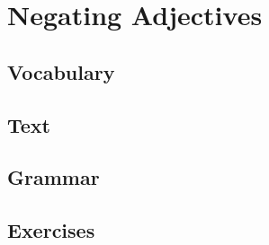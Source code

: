 \chapter{Negating Adjectives}
\section*{Vocabulary}
\section*{Text}
\section*{Grammar}
\section*{Exercises}

